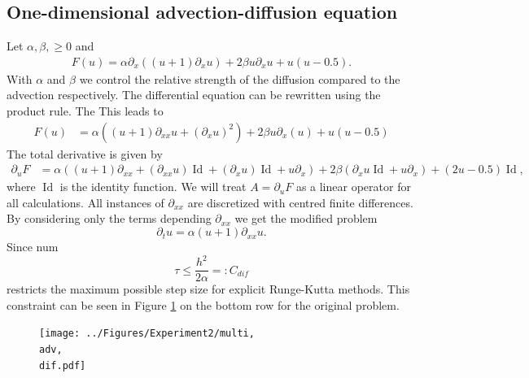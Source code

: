 \documentclass{scrartcl}
\newcommand{\eqdefn}{=\mathrel{\mathop:}}
\begin{document}
	\subsection{One-dimensional advection-diffusion equation}
	Let $\alpha,\beta,\ge 0$ and 
	\begin{align*}
		F(u) = \alpha\partial_x((u+1)\partial_xu) + 2\beta u\partial_x u + u(u-0.5).
	\end{align*}
	With $\alpha$ and $\beta$ we control the relative strength of the diffusion compared to the advection respectively. The differential equation can be rewritten using the product rule.
	The 
	This leads to
	\begin{align*}
		F(u) &= 
			\alpha((u+1)\partial_{xx}u + (\partial_{x}u)^2) 
			+ 2\beta u\partial_x(u) 
			+ u(u-0.5)
	\end{align*}
	The total derivative is given by
	\begin{align*}
		\partial_{u}F &= 
			\alpha((u+1)\partial_{xx} + (\partial_{xx}u)\operatorname{Id} + (\partial_{x}u)\operatorname{Id} + u\partial_{x}) 
			+ 2\beta(\partial_xu\operatorname{Id} + u\partial_x) 
			+ (2u-0.5)\operatorname{Id}
			,
	\end{align*}
	where $\operatorname{Id}$ is the identity function. We will treat $A = \partial_{u}F$ as a linear operator for all calculations.
	All instances of $\partial_{xx}$ are discretized with centred finite differences. 
%	
	By considering only the terms depending $\partial_{xx}$ we get the modified problem
	\[
		\partial_{t}u = \alpha (u+1)\partial_{xx}u.
	\] 
	Since num
	\[
		\tau \le \frac{h^2}{2\alpha} \eqdefn C_{dif}
	\]
	restricts the maximum possible step size for explicit Runge-Kutta methods. This constraint can be seen in Figure \ref{fig:multi1DNonlinear} on the bottom row for the original problem.
	\begin{figure}[H]
		\newcommand{\adv}{\detokenize{α}=0.1}
		\newcommand{\dif}{\detokenize{β}=0.01}
		\centering
		\texttt{[image: ../Figures/Experiment2/multi, \\adv, \\dif.pdf]}
		\caption{}
		\label{fig:multi1DNonlinear}
	\end{figure}
	
\end{document}
